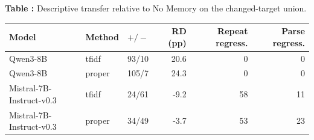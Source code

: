 \begin{center}
\label{tab:risk}
\textbf{Table \thetable:} Descriptive transfer relative to No Memory on the changed-target union.\par\smallskip
\small
\begin{tabular}{llrrrr}
\toprule
Model & Method & $+/-$ & RD (pp) & Repeat regress. & Parse regress. \\
\midrule
Qwen3-8B & tfidf & 93/10 & 20.6 & 0 & 0 \\
Qwen3-8B & proper & 105/7 & 24.3 & 0 & 0 \\
Mistral-7B-Instruct-v0.3 & tfidf & 24/61 & -9.2 & 58 & 11 \\
Mistral-7B-Instruct-v0.3 & proper & 34/49 & -3.7 & 53 & 23 \\
\bottomrule
\end{tabular}
\end{center}
